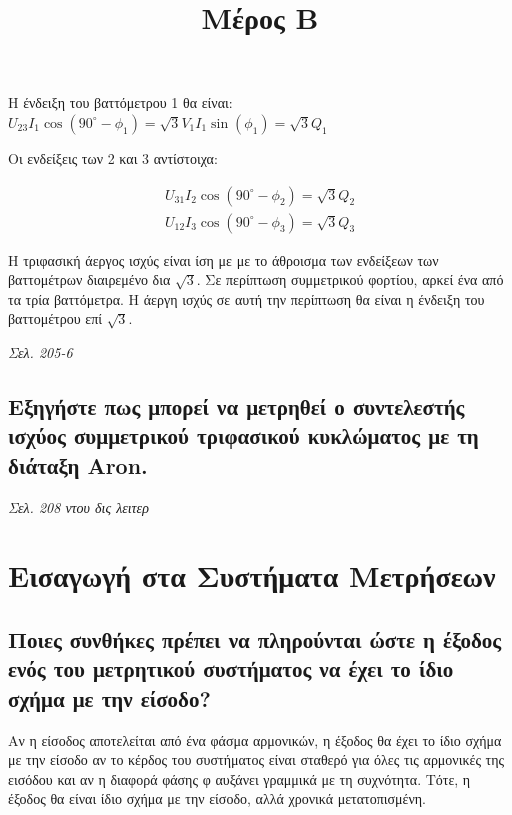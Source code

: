 \documentclass{article}
\begin{document}
Η ένδειξη του βαττόμετρου 1 θα είναι: $U_{23}I_1\cos(90^\circ - \phi_1) = \sqrt{3}V_1I_1\sin(\phi_1) = \sqrt{3}Q_1$
\newpage

Οι ενδείξεις των 2 και 3 αντίστοιχα:

\begin{align*}
    U_{31}I_2\cos(90^\circ - \phi_2)=\sqrt3Q_2 \\
    U_{12}I_3\cos(90^\circ - \phi_3)=\sqrt3Q_3
\end{align*}

Η τριφασική άεργος ισχύς είναι ίση με με το άθροισμα των ενδείξεων των βαττομέτρων διαιρεμένο δια $\sqrt{3}$. Σε περίπτωση συμμετρικού φορτίου, αρκεί ένα από τα τρία βαττόμετρα. Η άεργη ισχύς σε αυτή την περίπτωση θα είναι η ένδειξη του βαττομέτρου επί $\sqrt{3}$.

\emph{Σελ. 205-6}
\subsection{Εξηγήστε πως μπορεί να μετρηθεί ο συντελεστής ισχύος συμμετρικού τριφασικού κυκλώματος με τη διάταξη \foreignlanguage{english}{Aron}.}
\emph{Σελ. 208 ντου δις λειτερ}


\title{Μέρος Β}

\maketitle

\section{Εισαγωγή στα Συστήματα Μετρήσεων}
\subsection{Ποιες συνθήκες πρέπει να πληρούνται ώστε η έξοδος ενός του μετρητικού συστήματος να έχει το ίδιο σχήμα με την είσοδο?}
Αν η είσοδος αποτελείται από ένα φάσμα αρμονικών, η έξοδος θα έχει το ίδιο σχήμα με την είσοδο αν το κέρδος του συστήματος είναι σταθερό για
όλες τις αρμονικές της εισόδου και αν η διαφορά φάσης φ αυξάνει γραμμικά με τη συχνότητα. Τότε, η έξοδος θα είναι ίδιο σχήμα με την είσοδο,
αλλά χρονικά μετατοπισμένη. 
\end{document}
